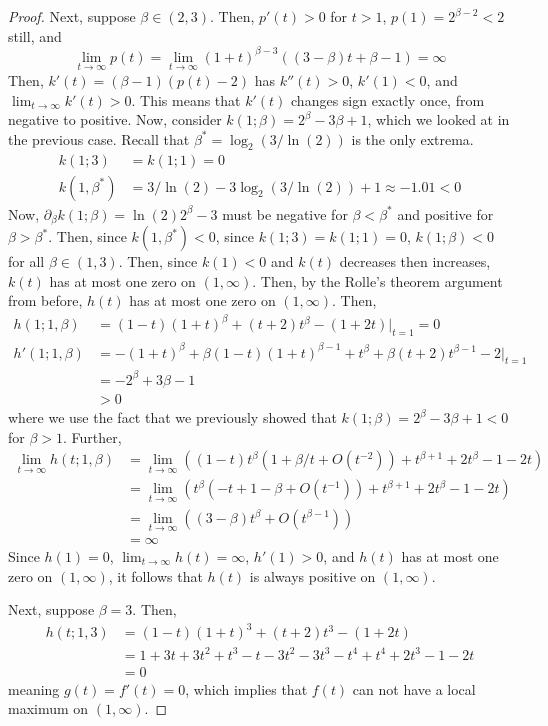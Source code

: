 \documentclass[10pt,a4paper]{amsart}
\newcommand{\p}{\partial}
\begin{document}
\begin{proof}
Next, suppose $\beta\in (2,3)$. Then, $p'(t)>0$ for $t>1$, $p(1)=2^{\beta-2}<2$ still, and 
$$\lim_{t\to \infty}p(t)=\lim_{t\to \infty}(1+t)^{\beta-3}((3-\beta)t+\beta-1)=\infty$$
Then, $k'(t)=(\beta-1)(p(t)-2)$ has $k''(t)>0$, $k'(1)<0$, and $\lim_{t\to \infty}k'(t)>0$. This means that $k'(t)$ changes sign exactly once, from negative to positive. Now, consider $k(1;\beta)=2^\beta-3\beta +1$, which we looked at in the previous case. Recall that $\beta^*=\log_2(3/\ln(2))$ is the only extrema. 
\begin{align*}
    k(1;3)&=k(1;1)=0\\
    k(1,\beta^*)&=3/\ln(2)-3\log_2(3/\ln(2))+1\approx -1.01<0
\end{align*}
Now, $\p_\beta k(1;\beta)=\ln(2)2^\beta-3$ must be negative for $\beta < \beta^*$ and positive for $\beta > \beta^*$. Then, since $k(1,\beta^*)<0$, since $k(1;3)=k(1;1)=0$, $k(1;\beta)<0$ for all $\beta \in (1,3)$. Then, since $k(1)<0$ and $k(t)$ decreases then increases, $k(t)$ has at most one zero on $(1,\infty)$. Then, by the Rolle's theorem argument from before, $h(t)$ has at most one zero on $(1,\infty)$. Then,
\begin{align*}
    h(1;1,\beta)&=(1-t)(1+t)^\beta +(t+2)t^\beta -(1+2t)\bigg|_{t=1}=0\\
    h'(1;1,\beta)&=-(1+t)^\beta +\beta(1-t)(1+t)^{\beta-1}+t^\beta +\beta (t+2)t^{\beta-1}-2\bigg|_{t=1}\\
    &=-2^\beta +3\beta-1\\
    &>0
\end{align*}
where we use the fact that we previously showed that $k(1;\beta)=2^\beta -3\beta + 1<0$ for $\beta > 1$. Further,
\begin{align*}
    \lim_{t\to \infty}h(t;1,\beta)&=\lim_{t\to \infty}((1-t)t^\beta(1+\beta/t+O(t^{-2}))+t^{\beta+1}+2t^{\beta}-1-2t)\\
    &=\lim_{t\to \infty}(t^{\beta}(-t+1-\beta +O(t^{-1}))+t^{\beta+1}+2t^{\beta}-1-2t)\\
    &=\lim_{t\to \infty}((3-\beta)t^{\beta}+O(t^{\beta-1}))\\
    &=\infty 
\end{align*}
Since $h(1)=0$, $\lim_{t\to \infty}h(t)=\infty$, $h'(1)>0$, and $h(t)$ has at most one zero on $(1,\infty)$, it follows that $h(t)$ is always positive on $(1,\infty)$. 

Next, suppose $\beta=3$. Then,
\begin{align*}
    h(t;1,3)&=(1-t)(1+t)^3 +(t+2)t^3 -(1+2t)\\
    &=1+3t+3t^2+t^3 -t-3t^2-3t^3 -t^4 +t^4 +2t^3 -1-2t\\
    &=0
\end{align*}
meaning $g(t)=f'(t)=0$, which implies that $f(t)$ can not have a local maximum on $(1,\infty)$. 


\end{proof}
\end{document}
